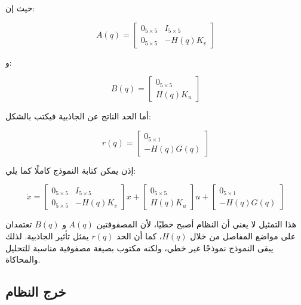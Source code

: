 حيث إن:

\begin{equation}
A(q)=
\begin{bmatrix}
0_{5\times5} & I_{5\times5}\\
0_{5\times5} & -H(q)K_v
\end{bmatrix}
\label{eq:control_A_matrix}
\end{equation}

و:

\begin{equation}
B(q)=
\begin{bmatrix}
0_{5\times5}\\
H(q)K_u
\end{bmatrix}
\label{eq:control_B_matrix}
\end{equation}

أما الحد الناتج عن الجاذبية فيكتب بالشكل:

\begin{equation}
r(q)=
\begin{bmatrix}
0_{5\times1}\\
-H(q)G(q)
\end{bmatrix}
\label{eq:control_r_vector}
\end{equation}

إذن يمكن كتابة النموذج كاملًا كما يلي:

\begin{equation}
\dot{x}
=
\begin{bmatrix}
0_{5\times5} & I_{5\times5}\\
0_{5\times5} & -H(q)K_v
\end{bmatrix}
x
+
\begin{bmatrix}
0_{5\times5}\\
H(q)K_u
\end{bmatrix}
u
+
\begin{bmatrix}
0_{5\times1}\\
-H(q)G(q)
\end{bmatrix}
\label{eq:control_full_state_space_matrix_form}
\end{equation}

هذا التمثيل لا يعني أن النظام أصبح خطيًا، لأن المصفوفتين \(A(q)\) و \(B(q)\) تعتمدان على مواضع المفاصل من خلال \(H(q)\)، كما أن الحد \(r(q)\) يمثل تأثير الجاذبية. لذلك يبقى النموذج نموذجًا غير خطي، ولكنه مكتوب بصيغة مصفوفية مناسبة للتحليل والمحاكاة.

\subsection{خرج النظام}

